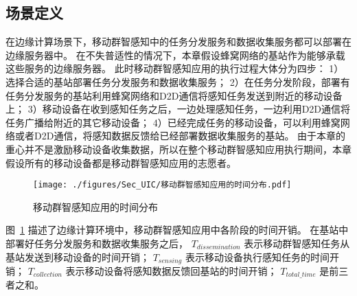 \subsection{场景定义}


在边缘计算场景下，移动群智感知中的任务分发服务和数据收集服务都可以部署在边缘服务器中。
在不失普适性的情况下，本章假设蜂窝网络的基站作为能够承载这些服务的边缘服务器。
此时移动群智感知应用的执行过程大体分为四步：
1）选择合适的基站部署任务分发服务和数据收集服务；
2）在任务分发阶段，部署有任务分发服务的基站利用蜂窝网络和D2D通信将感知任务发送到附近的移动设备上；
3）移动设备在收到感知任务之后，一边处理感知任务，一边利用D2D通信将任务广播给附近的其它移动设备；
4）已经完成任务的移动设备，可以利用蜂窝网络或者D2D通信，将感知数据反馈给已经部署数据收集服务的基站。
由于本章的重心并不是激励移动设备收集数据，所以在整个移动群智感知应用执行期间，本章假设所有的移动设备都是移动群智感知应用的志愿者。

\begin{figure}[!h]
  \centering
  \vspace{-1em}
  \texttt{[image: ./figures/Sec\_UIC/移动群智感知应用的时间分布.pdf]}
  \vspace{-0.5em}
  \caption{移动群智感知应用的时间分布}
  \vspace{-1em}
  \label{Figure_MCS_Delay}
\end{figure}

图~\ref{Figure_MCS_Delay} 描述了边缘计算环境中，移动群智感知应用中各阶段的时间开销。
在基站中部署好任务分发服务和数据收集服务之后，
$T_{dissemination}$ 表示移动群智感知任务从基站发送到移动设备的时间开销；
$T_{sensing}$ 表示移动设备执行感知任务的时间开销；
$T_{collection}$ 表示移动设备将感知数据反馈回基站的时间开销；
$T_{total\_time}$ 是前三者之和。



